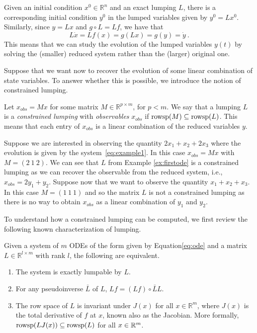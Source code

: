 Given an initial condition $x^{0} \in \mathbb{R}^n$ and an exact lumping $L$, there is a corresponding initial condition $y^{0}$ in the lumped variables given by $y^{0} = L x^{0}$.
Similarly, since $y=Lx$ and $g\circ L = Lf$, we have that \[L\dot{x} = Lf(x)= g(Lx)=g(y)=\dot{y}\ .\]
This means that we can study the evolution of the lumped variables $y(t)$ by solving the (smaller) reduced system rather than the (larger) original one.

Suppose that we want now to recover the evolution of some linear combination of state variables.
To answer whether this is possible, we introduce the notion of constrained lumping.

\begin{definition}
	Let $x_{obs}= Mx$ for some matrix $M \in \mathbb{R}^{p\times m}$, for $p< m$.
	We say that a lumping $L$  is a \emph{constrained lumping} with \emph{observables} $x_{obs}$ if  $\operatorname*{rowsp}(M) \subseteq \operatorname*{rowsp}(L)$.
	This means that each entry of $x_{obs}$ is a linear combination of the reduced 	variables $y$. 	
\end{definition}

\begin{myExample}
	Suppose we are interested in observing the quantity $2x_{1}+x_{2}+2x_{3}$ where the evolution is given by the system~\eqref{eq:example1}.
	In this case $x_{obs}= Mx$ with $M = ( 2\ 1\ 2)$.
	We can see that  $L$ from Example \ref{ex:firstode} is a constrained lumping as we can recover the observable from the reduced system, i.e., $ x_{obs}=2y_{1}+y_{2}$.
	Suppose now that we want to observe the quantity $x_{1}+x_{2}+x_{3}$.
	In this case $M = ( 1\ 1\ 1)$ and so the matrix $L$ is not a constrained lumping as there is no way to obtain $x_{obs}$ as a linear combination of $y_{1}$ and $y_{2}$.
\end{myExample}

To understand how a constrained lumping can be computed, we first review the following known characterization of lumping.

\begin{theorem}\label{thm:lumping}
	Given a system of $m$ ODEs of the form given by Equation\eqref{eq:ode} and a matrix $L\in \mathbb{R}^{l\times m}$ with rank $l$, the following are equivalent.
	\begin{enumerate}
		\item The system is exactly lumpable by $L$.
		      \item\label{thm:lumping:inverse} For any pseudoinverse $\bar{L}$ of $L$, $Lf = (Lf) \circ \bar{L}L$.
		      \item\label{thm:lumping:invariant} The row space of $L$ is invariant under $J(x)$ for all $x\in \mathbb{R}^{m}$, where $J(x)$ is the total derivative of $f$ at $x$, known also as the Jacobian.
		      More formally, $\operatorname*{rowsp}(L J(x)) \subseteq \operatorname*{rowsp}(L)$ for all $x \in \mathbb{R}^m$.
	\end{enumerate}
\end{theorem}

